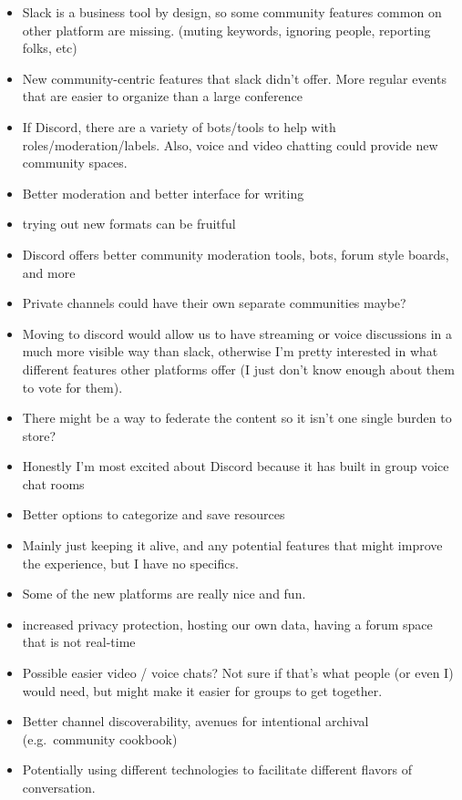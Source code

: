 \documentclass[
]{book}
\providecommand{\tightlist}{%
  \setlength{\itemsep}{0pt}\setlength{\parskip}{0pt}}
\begin{document}
\begin{itemize}
\tightlist
\item
  Slack is a business tool by design, so some community features common on other platform are missing. (muting keywords, ignoring people, reporting folks, etc)
\item
  New community-centric features that slack didn't offer. More regular events that are easier to organize than a large conference
\item
  If Discord, there are a variety of bots/tools to help with roles/moderation/labels. Also, voice and video chatting could provide new community spaces.
\item
  Better moderation and better interface for writing
\item
  trying out new formats can be fruitful
\item
  Discord offers better community moderation tools, bots, forum style boards, and more
\item
  Private channels could have their own separate communities maybe?
\item
  Moving to discord would allow us to have streaming or voice discussions in a much more visible way than slack, otherwise I'm pretty interested in what different features other platforms offer (I just don't know enough about them to vote for them).
\item
  There might be a way to federate the content so it isn't one single burden to store?
\item
  Honestly I'm most excited about Discord because it has built in group voice chat rooms
\item
  Better options to categorize and save resources
\item
  Mainly just keeping it alive, and any potential features that might improve the experience, but I have no specifics.
\item
  Some of the new platforms are really nice and fun.
\item
  increased privacy protection, hosting our own data, having a forum space that is not real-time
\item
  Possible easier video / voice chats? Not sure if that's what people (or even I) would need, but might make it easier for groups to get together.
\item
  Better channel discoverability, avenues for intentional archival (e.g.~community cookbook)
\item
  Potentially using different technologies to facilitate different flavors of conversation.
\end{itemize}
\end{document}
